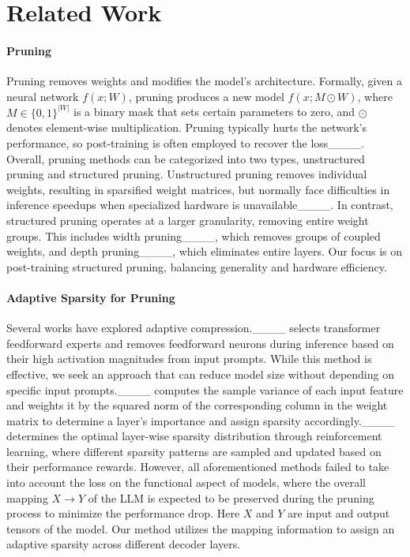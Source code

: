 \section{Related Work}
\label{sec:Related Work}

\paragraph{Pruning} Pruning removes weights and modifies the model's architecture. Formally, given a neural network $f(x;W)$, pruning produces a new model $f(x;M \odot W)$, where $M \in \{0,1\}^{|W|}$ is a binary mask that sets certain parameters to zero, and $\odot$ denotes element-wise multiplication. Pruning typically hurts the network's performance, so post-training is often employed to recover the loss____. Overall, pruning methods can be categorized into two types, unstructured pruning and structured pruning. Unstructured pruning removes individual weights, resulting in sparsified weight matrices, but normally face difficulties in inference speedups when specialized hardware is unavailable____. In contrast, structured pruning operates at a larger granularity, removing entire weight groups. This includes width pruning____, which removes groups of coupled weights, and depth pruning____, which eliminates entire layers. Our focus is on post-training structured pruning, balancing generality and hardware efficiency.

\paragraph{Adaptive Sparsity for Pruning} Several works have explored adaptive compression.____ selects transformer feedforward experts and removes feedforward neurons during inference based on their high activation magnitudes from input prompts. While this method is effective, we seek an approach that can reduce model size without depending on specific input prompts.____ computes the sample variance of each input feature and weights it by the squared norm of the corresponding column in the weight matrix to determine a layer’s importance and assign sparsity accordingly.____ determines the optimal layer-wise sparsity distribution through reinforcement learning, where different sparsity patterns are sampled and updated based on their performance rewards. However, all aforementioned methods failed to take into account the loss on the functional aspect of models, where the overall mapping $X \rightarrow Y$ of the LLM is expected to be preserved during the pruning process to minimize the performance drop. Here $X$ and $Y$ are input and output tensors of the model. Our method utilizes the mapping information to assign an adaptive sparsity across different decoder layers.

